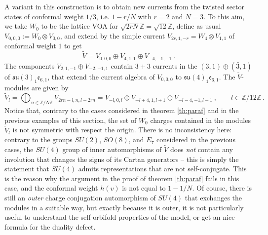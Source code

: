 \documentclass[11pt,reqno]{article}
\newcommand{\be}{\begin{equation}}
\newcommand{\ee}{\end{equation}}
\newcommand{\ZZ}{\mathbb{Z}}
\newcommand{\alg}[1]{\mathfrak{#1}}
\begin{document}
A variant in this construction is to obtain new currents from the twisted sector states of conformal weight $1/3$, i.e. $1-r/N$ with $r=2$ and $N=3$. To this aim, we take $W_0$ to be the lattice VOA for $\sqrt{2rN}\ZZ=\sqrt{12}\ZZ$, define as usual $V_{0,0,0}:=W_0\otimes V_{0,0}$, and extend by the simple current $V_{2r,1,-r}=W_{4}\otimes V_{1,1}$ of conformal weight $1$ to get
\be \tilde V=V_{0,0,0}\oplus V_{4,1,1}\oplus V_{-4,-1,-1}\ .
\ee The components $V_{2,1,-1}\oplus V_{-2,-1,1}$ contain $3+3$ currents in the $(3,1)\oplus (\bar 3,1)$ of $\alg{su}(3)_1\alg{e}_{6,1}$, that extend the current algebra of $V_{0,0,0}$ to $\alg{su}(4)_1\alg{e}_{6,1}$. The $\tilde V$-modules are given by 
\be \tilde V_l=\bigoplus_{n\in \ZZ/N\ZZ} V_{2rn-l,n,l-2rn}=V_{-l,0,l}\oplus V_{-l+4,1,l+1}\oplus V_{-l-4,-1,l-1}\ ,\qquad l\in \ZZ/12\ZZ\ .
\ee Notice that, contrary to the cases considered in theorem \ref{th:paraf} and in the previous examples of this section, the set of $W_0$ charges contained in the modules $\tilde V_l$ is not symmetric with respect the origin. There is no inconsistency here: contrary to the groups $SU(2)$, $SO(8)$, and $E_7$ considered in the previous cases, the $SU(4)$ group of inner automorphisms of $\tilde V$ does \emph{not} contain any involution that changes the signs of its Cartan generators -- this is simply the statement that $SU(4)$ admits representations that are not self-conjugate. This is the reason why the argument in the proof of theorem \ref{th:paraf} fails in this case, and the conformal weight $h(v)$ is not equal to $1-1/N$. Of course, there is still an \emph{outer} charge conjugation automorphism of $SU(4)$ that exchanges the modules in a suitable way, but exactly because it is outer, it is not particularly useful to understand the self-orbifold properties of the model, or get an nice formula for the duality defect.
\end{document}

